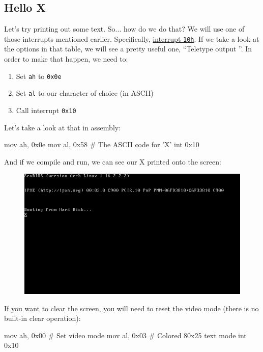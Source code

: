 \documentclass{article}
\begin{document}
\subsection{Hello X}

Let's try printing out some text. So... how do we do that? We will use one of those interrupts mentioned
earlier. Specifically, \href{https://en.wikipedia.org/wiki/INT_10H}{interrupt \Verb|10h|}. If we take a look at
the options in that table, we will see a pretty useful one, ``Teletype output ''. In order
to make that happen, we need to:

\begin{enumerate}
	\item Set \Verb|ah| to \Verb|0x0e|
	\item Set \Verb|al| to our character of choice (in ASCII)
	\item Call interrupt \Verb|0x10|
\end{enumerate}

Let's take a look at that in assembly:

\begin{gas}{}
	mov ah, 0x0e
	mov al, 0x58 # The ASCII code for 'X'
	int 0x10
\end{gas}

And if we compile and run, we can see our X printed onto the screen:

\begin{figure}[H]
	\includegraphics[width=\textwidth]{hellox.png}
\end{figure}

If you want to clear the screen, you will need to reset the video mode (there is no built-in clear operation):

\begin{gas}{}
	mov ah, 0x00 # Set video mode
	mov al, 0x03 # Colored 80x25 text mode
	int 0x10
\end{gas}
\end{document}
